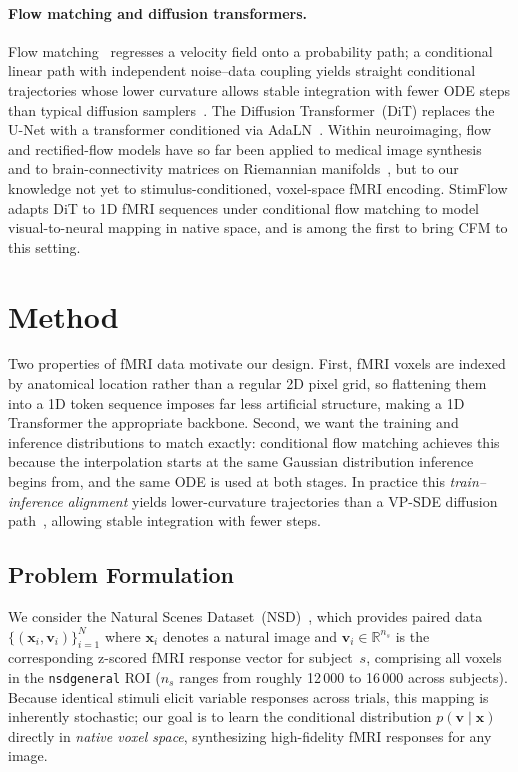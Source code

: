 \documentclass[runningheads]{llncs}
\begin{document}
\paragraph{Flow matching and diffusion transformers.}
Flow matching~\cite{lipman2023} regresses a velocity field onto a probability path; a conditional linear path with independent noise--data coupling yields straight conditional trajectories whose lower curvature allows stable integration with fewer ODE steps than typical diffusion samplers~\cite{rectifiedflow,song2021scorebased}. The Diffusion Transformer~(DiT) replaces the U-Net with a transformer conditioned via AdaLN~\cite{dit,esser2024sd3}. Within neuroimaging, flow and rectified-flow models have so far been applied to medical image synthesis~\cite{fm_medsyn2025} and to brain-connectivity matrices on Riemannian manifolds~\cite{diffeocfm2025}, but to our knowledge not yet to stimulus-conditioned, voxel-space fMRI encoding. StimFlow adapts DiT to 1D fMRI sequences under conditional flow matching to model visual-to-neural mapping in native space, and is among the first to bring CFM to this setting.

\section{Method}
\label{sec:method}

Two properties of fMRI data motivate our design.
First, fMRI voxels are indexed by anatomical location rather than a regular 2D pixel grid,
so flattening them into a 1D token sequence imposes far less artificial structure, making a
1D Transformer the appropriate backbone.
Second, we want the training and inference distributions to match exactly: conditional
flow matching achieves this because the interpolation starts at the same Gaussian
distribution inference begins from, and the same ODE is used at both stages. In practice
this \emph{train--inference alignment} yields lower-curvature trajectories than a
VP-SDE diffusion path~\cite{rectifiedflow}, allowing stable integration with fewer
steps.

\subsection{Problem Formulation}
\label{sec:method-prob}

We consider the Natural Scenes Dataset~(NSD)~\cite{nsd}, which provides paired data
$\{(\mathbf{x}_i, \mathbf{v}_i)\}_{i=1}^{N}$ where $\mathbf{x}_i$ denotes a natural
image and $\mathbf{v}_i \in \mathbb{R}^{n_s}$ is the corresponding z-scored fMRI
response vector for subject~$s$, comprising all voxels in the \texttt{nsdgeneral} ROI
($n_s$ ranges from roughly 12\,000 to 16\,000 across subjects).
Because identical stimuli elicit variable responses across trials, this mapping is
inherently stochastic; our goal is to learn the conditional distribution
$p(\mathbf{v}\mid\mathbf{x})$ directly in \emph{native voxel space}, synthesizing
high-fidelity fMRI responses for any image.
\end{document}
